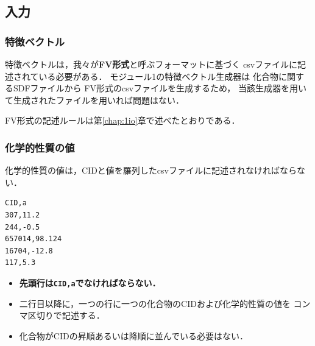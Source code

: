 \documentclass[11pt,titlepage,dvipdfmx,twoside]{jsbook}
\newcommand{\chapref}[1]{第\ref{chap:#1}章}
\begin{document}
\subsection{入力}
\subsubsection{特徴ベクトル}
特徴ベクトルは，我々が{\bf FV形式}と呼ぶフォーマットに基づく
csvファイルに記述されている必要がある．
モジュール1の特徴ベクトル生成器は
化合物に関するSDFファイルから
FV形式のcsvファイルを生成するため，
当該生成器を用いて生成されたファイルを用いれば問題はない．

FV形式の記述ルールは\chapref{1io}で述べたとおりである．

\subsubsection{化学的性質の値}
化学的性質の値は，CIDと値を羅列したcsvファイルに記述されなければならない．
\begin{oframed}
  {\small
\begin{verbatim}
CID,a
307,11.2
244,-0.5
657014,98.124
16704,-12.8
117,5.3
\end{verbatim}
}
\end{oframed}
\begin{itemize}
\item {\bf 先頭行は\verb|CID,a|でなければならない．}
\item 二行目以降に，一つの行に一つの化合物のCIDおよび化学的性質の値を
  コンマ区切りで記述する．
\item 化合物がCIDの昇順あるいは降順に並んでいる必要はない．
\end{itemize}
  
\end{document}
